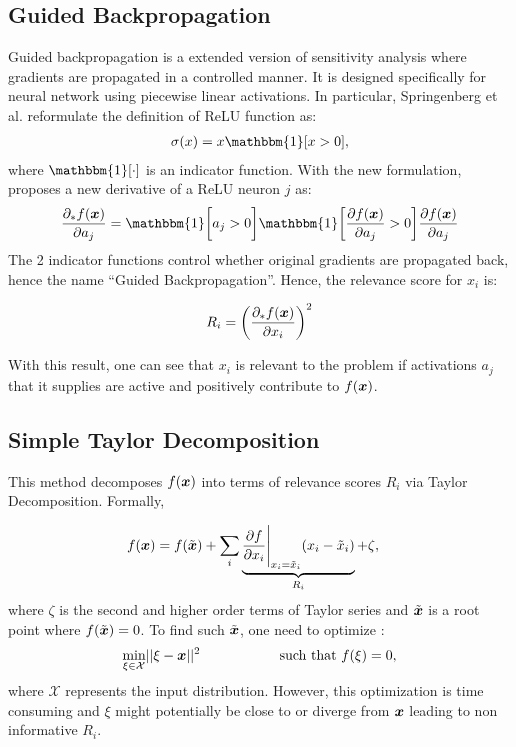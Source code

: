 \subsection{Guided Backpropagation}
Guided backpropagation is a extended version of sensitivity analysis where gradients are propagated in a controlled manner. It is designed specifically for neural network using piecewise linear activations. In particular, Springenberg et al.\cite{SpringenbergStrivingSimplicityAll2014e} reformulate the definition  of ReLU function as:
\begin{align*}
	\sigma(x) = x \mathbbm{1}[ x > 0 ],
\end{align*}
where $\mathbbm{1}[ \cdot ]$  is an indicator function. With the new formulation, \cite{SpringenbergStrivingSimplicityAll2014e} proposes a new derivative of a ReLU neuron $j$ as:
\begin{align*}
	\frac{\partial_* f(\patvector{x}) }{ \partial a_j } = \mathbbm{1}\bigg[a_j > 0 \bigg] \mathbbm{1}\bigg[ \frac{ \partial f(\patvector{x}) }{ \partial a_j } > 0 \bigg] \frac{ \partial f(\patvector{x}) }{ \partial a_j } 
\end{align*}
The 2 indicator functions control whether original gradients are propagated back, hence the name ``Guided Backpropagation''. Hence, the relevance score for $x_i$ is:

\begin{align*}
	R_i = \bigg( \frac{ \partial_* f(\patvector{x}) }{ \partial x_i }  \bigg)^2
\end{align*}

With this result, one can see that $x_i$ is relevant to the problem if activations $a_j$ that it supplies are active and positively contribute to $f(\patvector{x})$.


\subsection{Simple Taylor Decomposition}
This method decomposes $f(\patvector{x})$ into terms of relevance scores $R_i$ via Taylor Decomposition. Formally, 

\begin{align*}
	f(\patvector{x}) 	&= f(\tilde{\patvector{x}}) + \sum_{i} \underbrace{\frac{\partial f }{ \partial x_i } \Bigg|_{x_i = \tilde{x}_i}  ( x_i - \tilde{x}_i ) }_{R_i} + \zeta, 
\end{align*}
where $\zeta$ is the second and higher order terms of Taylor series and $\tilde{\patvector{x}}$ is a root point where $f(\tilde{\patvector{x}}) = 0 $.  To find such  $\tilde{\patvector{x}}$, one need to optimize :
$$
\underset{\xi \in \mathcal{X} }{\text{min}}  || \xi - \patvector{x} ||^2 \hspace{2cm}  \text{such that}\  f(\xi) = 0,
$$
where $\mathcal{X}$ represents the input distribution. However, this optimization is time consuming  and $\xi$ might potentially be close to or diverge from $\patvector{x}$ leading to non informative $R_i$.

